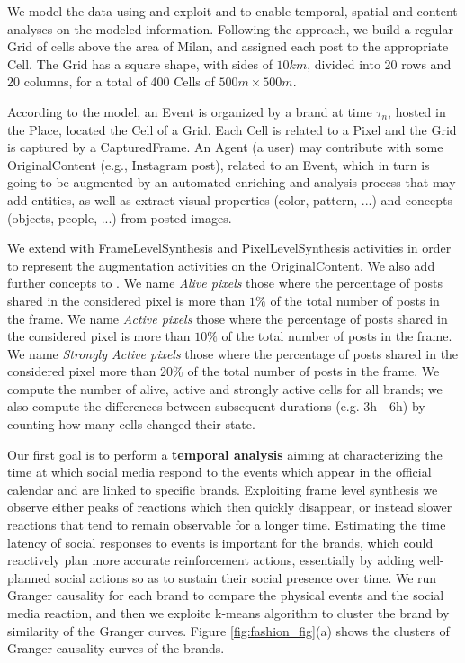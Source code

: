 We model the data using \frappe{} and exploit \sti{} and \hivedi{} to enable temporal, spatial and content analyses on the modeled information.
Following the \frappe{} approach, we build a regular \textsf{Grid} of \textsf{cell}s above the area of Milan, and assigned each post to the appropriate \textsf{Cell}. The \textsf{Grid} has a square shape, with sides of $10km$, divided into 20 rows and 20 columns, for a total of 400 \textsf{Cell}s of $500m \times 500m$. 

According to the \frappe{} model, an \textsf{Event} is organized by a brand at time $\tau_{n}$, hosted in the \textsf{Place}, located the \textsf{Cell} of a \textsf{Grid}. Each \textsf{Cell} is related to a \textsf{Pixel} and the \textsf{Grid} is captured by a \textsf{CapturedFrame}. An \textsf{Agent} (a user) may contribute with some \textsf{OriginalContent} (e.g., Instagram post), related to an \textsf{Event}, which in turn is going to be augmented by an automated enriching and analysis process that may add entities, as well as extract visual properties (color, pattern, ...) and concepts (objects, people, ...) from posted images.

We extend \frappe{} with \textsf{FrameLevelSynthesis} and \textsf{PixelLevelSynthesis} activities in order to represent the augmentation activities on the \textsf{OriginalContent}. We also add further concepts to \frappe{}.
We name \emph{Alive pixels} those where the percentage of posts shared in the considered pixel is more than $1\%$ of the total number of posts in the frame. We name \emph{Active pixels} those where the percentage of posts shared in the considered pixel is more than $10\%$ of the total number of posts in the frame. We name \emph{Strongly Active pixels} those where the percentage of posts shared in the considered pixel more than $20\%$ of the total number of posts in the frame.
We compute the number of alive, active and strongly active cells for all brands; we also compute the differences between subsequent durations (e.g. 3h - 6h) by counting how many cells changed their state.

Our first goal is to perform a \textbf{temporal analysis} aiming at characterizing the time at which social media respond to the events which appear in the official calendar and are linked to specific brands. 
Exploiting frame level synthesis we observe either peaks of reactions which then quickly disappear, or instead slower reactions that tend to remain observable for a longer time. Estimating the time latency of social responses to events is important for the brands, which could reactively plan more accurate reinforcement actions, essentially by adding well-planned social actions so as to sustain their social presence over time. We run Granger causality for each brand to compare the physical events and the social media reaction, and then we exploite k-means algorithm to cluster the brand by similarity of the Granger curves.
Figure \ref{fig:fashion_fig}(a) shows the clusters of Granger causality curves of the brands.

